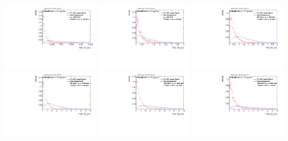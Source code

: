 \begin{figure}[H]
\includegraphics[width=0.3\textwidth]{sascha_input/Appendix/Distributions/w/distributions/beta2/h_assisted_tj_C2_2_bin6.pdf} 
\bigskip
\includegraphics[width=0.3\textwidth]{sascha_input/Appendix/Distributions/w/distributions/beta2/h_assisted_tj_D2_2_bin1.pdf} \hspace{1mm}
\includegraphics[width=0.3\textwidth]{sascha_input/Appendix/Distributions/w/distributions/beta2/h_assisted_tj_D2_2_bin2.pdf} \hspace{1mm}
\includegraphics[width=0.3\textwidth]{sascha_input/Appendix/Distributions/w/distributions/beta2/h_assisted_tj_D2_2_bin3.pdf} 
\bigskip
\includegraphics[width=0.3\textwidth]{sascha_input/Appendix/Distributions/w/distributions/beta2/h_assisted_tj_D2_2_bin4.pdf} \hspace{1mm}
\includegraphics[width=0.3\textwidth]{sascha_input/Appendix/Distributions/w/distributions/beta2/h_assisted_tj_D2_2_bin5.pdf} \hspace{1mm}

\end{figure}

